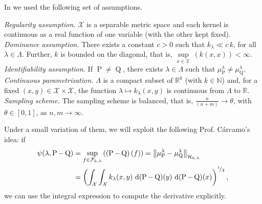 	In \textcite{Carcamo2024} we used the following set of assumptions.
	\begin{description}
		 \textit{Regularity assumption.} $\mathcal{X}$ is a separable metric space and each kernel is continuous as a real function of one variable (with the other kept fixed).
		 \textit{Dominance assumption.} There exists a constant $c>0$ such that $k_{\lambda}\ll c\,k$, for all $\lambda\in\Lambda$. Further, $k$ is bounded on the diagonal, that is, $\underset{x\in\mathcal{X}}{\operatorname{sup}}\,(k(x,x))<\infty$.
		 \textit{Identifiability assumption.} If $\operatorname{P}\neq\operatorname{Q}$, there exists $\lambda\in\Lambda$ such that $\mu_{\operatorname{P}}^{\lambda}\neq\mu_{\operatorname{Q}}^{\lambda}$.
		 \textit{Continuous parametrization.} $\Lambda$ is a compact subset of $\mathbb{R}^{k}$ (with $k\in\mathbb{N}$) and, for a fixed $(x,y)\in\mathcal{X}\times\mathcal{X}$, the function $\lambda\mapsto k_{\lambda}(x,y)$ is continuous from $\Lambda$ to $\mathbb{R}$.
		 \textit{Sampling scheme.} The sampling scheme is balanced, that is, $\frac{n}{(n+m)}\to\theta$, with $\theta\in[0,1]$, as $n,m\to\infty$.
	\end{description}
	Under a small variation of them, we will exploit the following Prof. C\'{a}rcamo's idea: if
	\begin{equation}\label{Eqn:ProfCarcaIdea}
		\begin{aligned}
			\psi(\lambda,\operatorname{P}-\operatorname{Q})&=\underset{f\in\mathcal{F}_{k,\lambda}}{\operatorname{sup}}\,((\operatorname{P}-\operatorname{Q})\,(f))=\left\|\mu_{\operatorname{P}}^{\lambda}-\mu_{\operatorname{Q}}^{\lambda}\right\|_{\mathcal{H}_{k,\lambda}}
			\\&=\left(\int_{\mathcal{X}}\int_{\mathcal{X}}k_{\lambda}(x,y)\,\operatorname{d}(\operatorname{P}-\operatorname{Q})(y)\,\operatorname{d}(\operatorname{P}-\operatorname{Q})(x)\right)^{^{1}\!/_{2}},
		\end{aligned}
	\end{equation}
	we can use the integral expression to compute the derivative explicitly.
	
